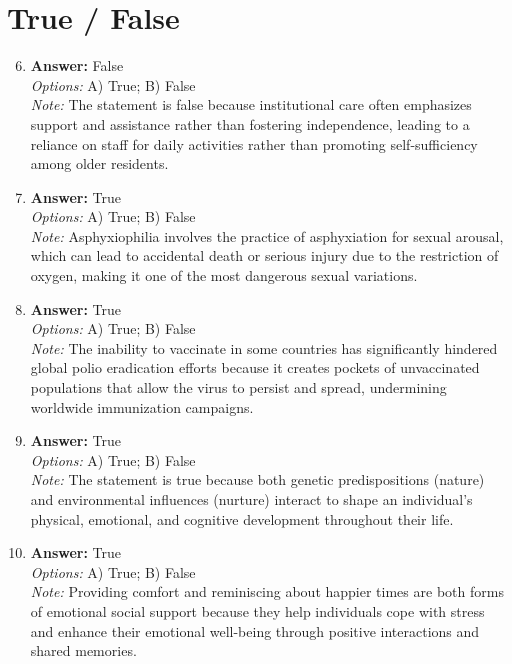 \documentclass[12pt]{article}
\begin{document}
\section*{True / False}
\begin{enumerate}[label=\arabic*.]
\setcounter{enumi}{5}
\item \textbf{Answer:} False
\\ \textit{Options:} A) True; B) False
\\ \textit{Note:} The statement is false because institutional care often emphasizes support and assistance rather than fostering independence, leading to a reliance on staff for daily activities rather than promoting self-sufficiency among older residents.
\item \textbf{Answer:} True
\\ \textit{Options:} A) True; B) False
\\ \textit{Note:} Asphyxiophilia involves the practice of asphyxiation for sexual arousal, which can lead to accidental death or serious injury due to the restriction of oxygen, making it one of the most dangerous sexual variations.
\item \textbf{Answer:} True
\\ \textit{Options:} A) True; B) False
\\ \textit{Note:} The inability to vaccinate in some countries has significantly hindered global polio eradication efforts because it creates pockets of unvaccinated populations that allow the virus to persist and spread, undermining worldwide immunization campaigns.
\item \textbf{Answer:} True
\\ \textit{Options:} A) True; B) False
\\ \textit{Note:} The statement is true because both genetic predispositions (nature) and environmental influences (nurture) interact to shape an individual's physical, emotional, and cognitive development throughout their life.
\item \textbf{Answer:} True
\\ \textit{Options:} A) True; B) False
\\ \textit{Note:} Providing comfort and reminiscing about happier times are both forms of emotional social support because they help individuals cope with stress and enhance their emotional well-being through positive interactions and shared memories.
\end{enumerate}
\end{document}
